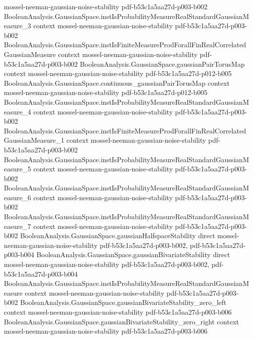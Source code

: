 \begin{theorem}
  {mossel-neeman-gaussian-noise-stability}
  {pdf-b53c1a5aa27d-p003-b002}
\proofstep
  {BooleanAnalysis.GaussianSpace.instIsProbabilityMeasureRealStandardGaussianMeasure_3}
  {context}
  {mossel-neeman-gaussian-noise-stability}
  {pdf-b53c1a5aa27d-p003-b002}
\proofstep
  {BooleanAnalysis.GaussianSpace.instIsFiniteMeasureProdForallFinRealCorrelatedGaussianMeasure}
  {context}
  {mossel-neeman-gaussian-noise-stability}
  {pdf-b53c1a5aa27d-p003-b002}
\proofstep
  {BooleanAnalysis.GaussianSpace.gaussianPairTorusMap}
  {context}
  {mossel-neeman-gaussian-noise-stability}
  {pdf-b53c1a5aa27d-p012-b005}
\proofstep
  {BooleanAnalysis.GaussianSpace.continuous_gaussianPairTorusMap}
  {context}
  {mossel-neeman-gaussian-noise-stability}
  {pdf-b53c1a5aa27d-p012-b005}
\proofstep
  {BooleanAnalysis.GaussianSpace.instIsProbabilityMeasureRealStandardGaussianMeasure_4}
  {context}
  {mossel-neeman-gaussian-noise-stability}
  {pdf-b53c1a5aa27d-p003-b002}
\proofstep
  {BooleanAnalysis.GaussianSpace.instIsFiniteMeasureProdForallFinRealCorrelatedGaussianMeasure_1}
  {context}
  {mossel-neeman-gaussian-noise-stability}
  {pdf-b53c1a5aa27d-p003-b002}
\proofstep
  {BooleanAnalysis.GaussianSpace.instIsProbabilityMeasureRealStandardGaussianMeasure_5}
  {context}
  {mossel-neeman-gaussian-noise-stability}
  {pdf-b53c1a5aa27d-p003-b002}
\proofstep
  {BooleanAnalysis.GaussianSpace.instIsProbabilityMeasureRealStandardGaussianMeasure_6}
  {context}
  {mossel-neeman-gaussian-noise-stability}
  {pdf-b53c1a5aa27d-p003-b002}
\proofstep
  {BooleanAnalysis.GaussianSpace.instIsProbabilityMeasureRealStandardGaussianMeasure_7}
  {context}
  {mossel-neeman-gaussian-noise-stability}
  {pdf-b53c1a5aa27d-p003-b002}
\proofstep
  {BooleanAnalysis.GaussianSpace.gaussianHalfspaceStability}
  {direct}
  {mossel-neeman-gaussian-noise-stability}
  {pdf-b53c1a5aa27d-p003-b002,
    pdf-b53c1a5aa27d-p003-b004}
\proofstep
  {BooleanAnalysis.GaussianSpace.gaussianBivariateStability}
  {direct}
  {mossel-neeman-gaussian-noise-stability}
  {pdf-b53c1a5aa27d-p003-b002,
    pdf-b53c1a5aa27d-p003-b004}
\proofstep
  {BooleanAnalysis.GaussianSpace.instIsProbabilityMeasureRealStandardGaussianMeasure}
  {context}
  {mossel-neeman-gaussian-noise-stability}
  {pdf-b53c1a5aa27d-p003-b002}
\proofstep
  {BooleanAnalysis.GaussianSpace.gaussianBivariateStability_zero_left}
  {context}
  {mossel-neeman-gaussian-noise-stability}
  {pdf-b53c1a5aa27d-p003-b006}
\proofstep
  {BooleanAnalysis.GaussianSpace.gaussianBivariateStability_zero_right}
  {context}
  {mossel-neeman-gaussian-noise-stability}
  {pdf-b53c1a5aa27d-p003-b006}

\end{theorem}
